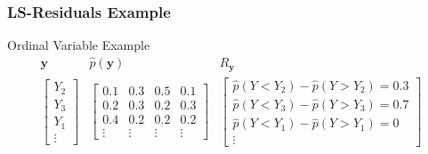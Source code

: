 \documentclass{beamer}
\begin{document}
\begin{frame}
	\frametitle{LS-Residuals Example}
	\begin{block}{Ordinal Variable Example}
		\vspace{-1em}
	\[
		\begin{array}{ccc}
			\bm{y} & \hat{p}(\bm{y}) & R_{\bm{y}} \\

			\begin{bmatrix}
				Y_2 \\
				Y_3 \\
				Y_1 \\
				\vdots
			\end{bmatrix} &
			\begin{bmatrix}
				0.1 & 0.3 & 0.5 & 0.1 \\
				0.2 & 0.3 & 0.2 & 0.3 \\
				0.4 & 0.2 & 0.2 & 0.2 \\
				\vdots & \vdots & \vdots & \vdots
			\end{bmatrix} &
			\begin{bmatrix}
				\hat{p}(Y < Y_2) - \hat{p}(Y>Y_2) = 0.3 \\
				\hat{p}(Y < Y_3) - \hat{p}(Y>Y_3) = 0.7 \\
				\hat{p}(Y < Y_1) - \hat{p}(Y>Y_1) = 0 \\
				\vdots
			\end{bmatrix} \\
		\end{array}
	\]
	\end{block}


\end{frame}
\end{document}
